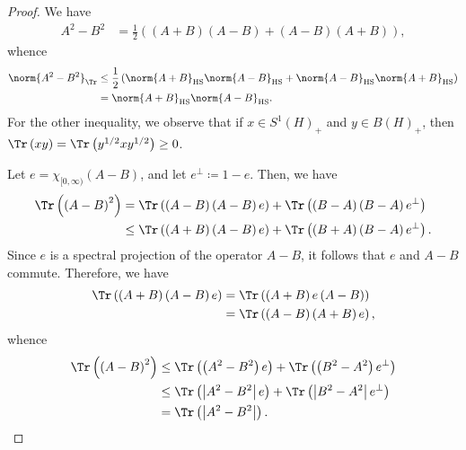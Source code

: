 \documentclass[10pt]{mypackage}
\renewcommand{\coloneq}{\coloneqq}
\begin{document}
\begin{proof}
  We have
  \begin{align*}
    A^2 - B^2 &= \frac{1}{2}\left( \left( A + B \right)\left( A-B \right) + \left( A - B \right)\left( A + B \right) \right),
  \end{align*}
  whence
  \begin{align*}
    \norm{A^2 - B^2}_{\Tr} &\leq \frac{1}{2} \left( \norm{A+B}_{\operatorname{HS}}\norm{A-B}_{\operatorname{HS}} + \norm{A-B}_{\operatorname{HS}}\norm{A+B}_{\operatorname{HS}} \right)\\
                           &= \norm{A+B}_{\operatorname{HS}}\norm{A-B}_{\operatorname{HS}}.
  \end{align*}
  For the other inequality, we observe that if $x\in S^1\left( H \right)_{+}$ and $y\in B(H)_{+}$, then $\Tr\left( xy \right) = \Tr\left( y^{1/2}xy^{1/2} \right)\geq 0$.

  Let $e = \chi_{[0,\infty)}\left( A-B \right)$, and let $e^{\perp}\coloneq 1-e$. Then, we have
  \begin{align*}
    \Tr\left( \left( A-B \right)^2 \right) &= \Tr\left( \left( A-B \right)\left( A-B \right)e \right) + \Tr\left( \left( B-A \right)\left( B-A \right)e^{\perp} \right)\\
                                           &\leq \Tr\left( \left( A + B \right)\left( A-B \right)e \right) + \Tr\left( \left( B+A \right)\left( B-A \right)e^{\perp} \right).
  \end{align*}
  Since $e$ is a spectral projection of the operator $A - B$, it follows that $e$ and $A - B$ commute. Therefore, we have
  \begin{align*}
    \Tr\left( \left( A + B \right)\left( A - B \right)e \right) &= \Tr\left( \left( A + B \right)e \left( A-B \right) \right)\\
                                                                &= \Tr\left( \left( A-B \right)\left( A + B \right)e \right),
  \end{align*}
  whence
  \begin{align*}
    \Tr\left( \left( A - B \right)^2 \right) &\leq \Tr\left( \left( A^2 - B^2 \right)e \right) + \Tr\left( \left( B^2 - A^2 \right)e^{\perp} \right)\\
                                             &\leq \Tr\left( \left\vert A^2 - B^2 \right\vert e \right) + \Tr\left( \left\vert B^2 - A^2 \right\vert e^{\perp} \right)\\
                                             &= \Tr\left( \left\vert A^2 - B^2 \right\vert \right).
  \end{align*}
\end{proof}
\end{document}
